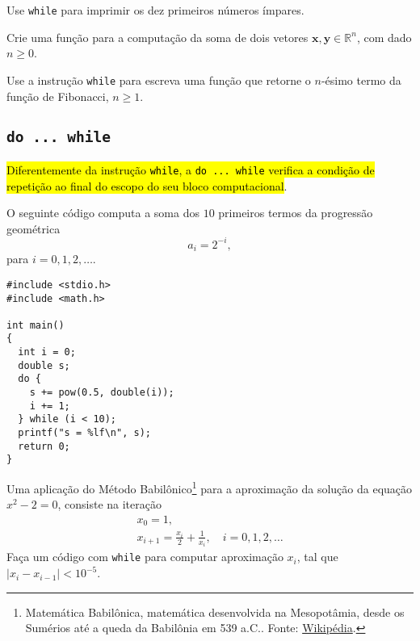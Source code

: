 \documentclass[12pt]{article}
\begin{document}
\begin{exr}
  Use \lstinline!while! para imprimir os dez primeiros números ímpares.
\end{exr}

\begin{exr}
  Crie uma função para a computação da soma de dois vetores $\pmb{x}, \pmb{y}\in\mathbb{R}^n$, com dado $n\geq 0$.
\end{exr}

\begin{exr}
  Use a instrução \lstinline!while! para escreva uma função que retorne o $n$-ésimo termo da função de Fibonacci{\fibonacci}, $n\geq 1$.
\end{exr}

\subsection{\texttt{do ... while}}

\hl{Diferentemente da instrução {\lstinline!while!}, a {\lstinline!do ... while!} verifica a condição de repetição ao final do escopo do seu bloco computacional}.

\begin{ex}
  O seguinte código computa a soma dos $10$ primeiros termos da progressão geométrica
  \begin{equation}
    a_i = 2^{-i},
  \end{equation}
  para $i = 0, 1, 2, \ldots$.

\begin{lstlisting}[caption=doWhile.cc]
#include <stdio.h>
#include <math.h>

int main()
{
  int i = 0;
  double s;
  do {
    s += pow(0.5, double(i));
    i += 1;
  } while (i < 10);
  printf("s = %lf\n", s);
  return 0;
}
\end{lstlisting}  
\end{ex}

\begin{exr}
  Uma aplicação do Método Babilônico\footnote{Matemática Babilônica, matemática desenvolvida na Mesopotâmia, desde os Sumérios até a queda da Babilônia em 539 a.C.. Fonte: \href{https://pt.wikipedia.org/wiki/Matem\%C3\%A1tica\_babil\%C3\%B4nica}{Wikipédia}.} para a aproximação da solução da equação $x^2-2 = 0$, consiste na iteração
  \begin{gather}
    x_0 = 1,\\
    x_{i+1} = \frac{x_i}{2} + \frac{1}{x_i},\quad i=0,1,2,\ldots
  \end{gather}
  Faça um código com \lstinline+while+ para computar aproximação $x_{i}$, tal que $|x_{i}-x_{i-1}|<10^{-5}$.
\end{exr}
\end{document}
